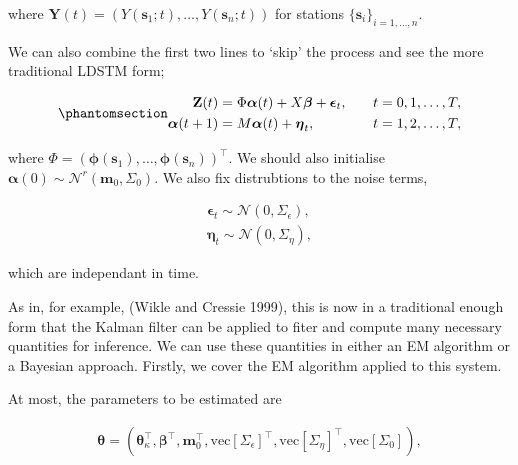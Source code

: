 \documentclass[
  letterpaper,
  DIV=11,
  numbers=noendperiod]{scrartcl}
\begin{document}
where
\(\boldsymbol{\mathbf{Y}}(t) = (Y(\boldsymbol{\mathbf{s}}_{1};t), \dots, Y(\boldsymbol{\mathbf{s}}_{n};t))\)
for stations \(\{\boldsymbol{\mathbf{s}}_{i}\}_{i=1,\dots, n}\).

We can also combine the first two lines to `skip' the process and see
the more traditional LDSTM form;

\begin{equation}\phantomsection\label{eq-ldstm}{
\begin{split}
\boldsymbol{\mathbf{Z}}(t) &= \Phi\boldsymbol{\mathbf{\alpha}}(t) + X\boldsymbol{\mathbf{\beta }}+ \boldsymbol{\mathbf{\epsilon}}_t,\quad &t = 0,1,\dots, T,\\
\boldsymbol{\mathbf{\alpha}}(t+1) &= M\boldsymbol{\mathbf{\alpha}}(t) + \boldsymbol{\mathbf{\eta}}_t,\quad &t = 1,2,\dots, T,\\
\end{split}
}\end{equation}

where
\(\Phi = (\boldsymbol{\mathbf{\phi}}(\boldsymbol{\mathbf{s}}_1),\dots,\boldsymbol{\mathbf{\phi}}(\boldsymbol{\mathbf{s}}_n))^\intercal\).
We should also initialise
\(\boldsymbol{\mathbf{\alpha}}(0) \sim \mathcal N^{r}(\boldsymbol{\mathbf{m}}_{0}, \Sigma_{0})\).
We also fix distrubtions to the noise terms,

\[
\begin{split}
\boldsymbol{\mathbf{\epsilon}}_t \sim \mathcal N(0,\Sigma_\epsilon),\\
\boldsymbol{\mathbf{\eta}}_t \sim \mathcal N(0,\Sigma_\eta),
\end{split}
\]

which are independant in time.

As in, for example, (Wikle and Cressie 1999), this is now in a
traditional enough form that the Kalman filter can be applied to fiter
and compute many necessary quantities for inference. We can use these
quantities in either an EM algorithm or a Bayesian approach. Firstly, we
cover the EM algorithm applied to this system.

At most, the parameters to be estimated are

\[
\begin{split}
\boldsymbol{\mathbf{\theta }}= \left(\boldsymbol{\mathbf{\theta}}_\kappa^\intercal, \boldsymbol{\mathbf{\beta}}^\intercal, \boldsymbol{\mathbf{m}}_0^\intercal, \mathrm{vec}[\Sigma_\epsilon]^\intercal, \mathrm{vec}[\Sigma_\eta]^\intercal, \mathrm{vec}[\Sigma_0]\right),
\end{split}
\]
\end{document}
